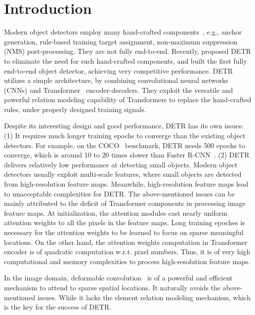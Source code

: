 \section{Introduction}


Modern object detectors employ many hand-crafted components~\citep{liu2020deep}, e.g., anchor generation, rule-based training target assignment, non-maximum suppression (NMS) post-processing. They are not fully end-to-end. Recently, \citet{carion2020end} proposed DETR to eliminate the need for such hand-crafted components, and built the first fully end-to-end object detector, achieving very competitive performance. DETR utilizes a simple architecture, by combining convolutional neural networks (CNNs) and Transformer~\citep{vaswani2017attention} encoder-decoders. They exploit the versatile and powerful relation modeling capability of Transformers to replace the hand-crafted rules, under properly designed training signals. 


Despite its interesting design and good performance, DETR has its own issues: (1) It requires much longer training epochs to converge than the existing object detectors. For example, on the COCO~\citep{lin2014microsoft} benchmark, DETR needs 500 epochs to converge, which is around 10 to 20 times slower than Faster R-CNN~\citep{ren2015faster}. (2) DETR delivers relatively low performance at detecting small objects. Modern object detectors usually exploit multi-scale features, where small objects are detected from high-resolution feature maps. Meanwhile, high-resolution feature maps lead to unacceptable complexities for DETR. The above-mentioned issues can be mainly attributed to the deficit of Transformer components in processing image feature maps. At initialization, the attention modules cast nearly uniform attention weights to all the pixels in the feature maps. Long training epoches is necessary for the attention weights to be learned to focus on sparse meaningful locations.
On the other hand, the attention weights computation in Transformer encoder is of quadratic computation w.r.t. pixel numbers. Thus, it is of very high computational and memory complexities to process high-resolution feature maps.


In the image domain, deformable convolution~\citep{dai2017deformable} is of a powerful and efficient mechanism to attend to sparse spatial locations. It naturally avoids the above-mentioned issues. While it lacks the element relation modeling mechanism, which is the key for the success of DETR.


